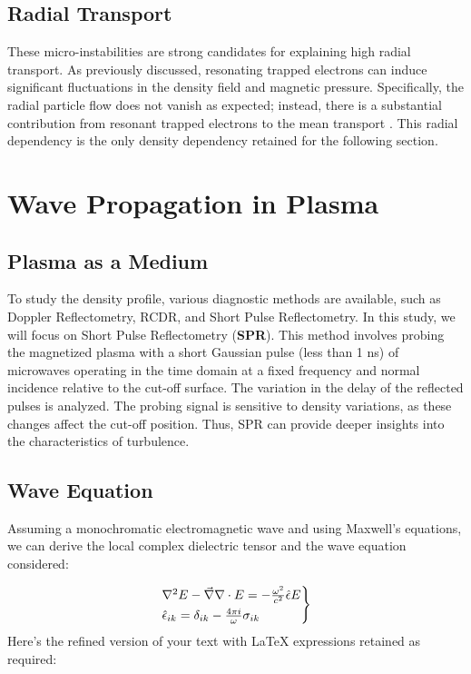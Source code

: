 \documentclass[11pt,a4paper,openany]{report}
\begin{document}
\begin{multicols}{2}
    \subsection{Radial Transport}
    These micro-instabilities are strong candidates for explaining high radial transport. As previously discussed, resonating trapped electrons can induce significant fluctuations in the density field and magnetic pressure. Specifically, the radial particle flow does not vanish as expected; instead, there is a substantial contribution from resonant trapped electrons to the mean transport \cite{San_diego}. This radial dependency is the only density dependency retained for the following section.

    \section{Wave Propagation in Plasma}

    \subsection{Plasma as a Medium}

    To study the density profile, various diagnostic methods are available, such as Doppler Reflectometry, RCDR, and Short Pulse Reflectometry. In this study, we will focus on Short Pulse Reflectometry (\textbf{SPR}). This method involves probing the magnetized plasma with a short Gaussian pulse (less than 1 ns) of microwaves operating in the time domain at a fixed frequency and normal incidence relative to the cut-off surface. The variation in the delay of the reflected pulses is analyzed. The probing signal is sensitive to density variations, as these changes affect the cut-off position. Thus, SPR can provide deeper insights into the characteristics of turbulence.

    \subsection{Wave Equation}

    Assuming a monochromatic electromagnetic wave and using Maxwell's equations, we can derive the local complex dielectric tensor and the wave equation considered:

    \begin{equation}
        \begin{rcases}
            \laplacian E -  \vec{\nabla}\nabla \cdot E = -\frac{\omega^2}{c^2} \hat{\epsilon} E \\
            \hat{\epsilon}_{ik} = \delta _{ik} - \frac{4\pi i}{\omega} \sigma_{ik}
        \end{rcases}
    \end{equation}
    Here's the refined version of your text with LaTeX expressions retained as required:


\end{multicols}
\end{document}
